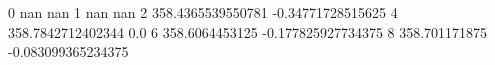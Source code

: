 0 nan nan
1 nan nan
2 358.4365539550781 -0.34771728515625
4 358.7842712402344 0.0
6 358.6064453125 -0.177825927734375
8 358.701171875 -0.083099365234375
